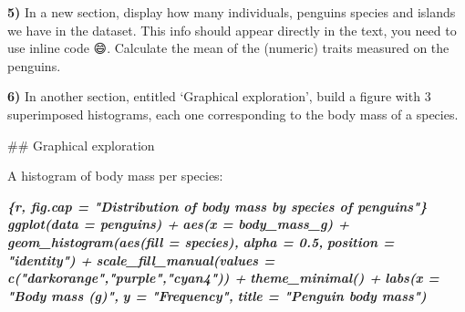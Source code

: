 \documentclass[
  12pt,
]{book}
\newenvironment{Shaded}{\begin{snugshade}}{\end{snugshade}}
\newcommand{\FunctionTok}[1]{\textcolor[rgb]{0.00,0.00,0.00}{#1}}
\newcommand{\InformationTok}[1]{\textcolor[rgb]{0.56,0.35,0.01}{\textbf{\textit{#1}}}}
\newcommand{\NormalTok}[1]{#1}
\begin{document}
\textbf{5)} In a new section, display how many individuals, penguins species and islands we have in the dataset. This info should appear directly in the text, you need to use inline code 😄. Calculate the mean of the (numeric) traits measured on the penguins.

\begin{Shaded}
\end{Shaded}

\textbf{6)} In another section, entitled `Graphical exploration', build a figure with 3 superimposed histograms, each one corresponding to the body mass of a species.

\begin{Shaded}
\begin{Highlighting}[]
\FunctionTok{\#\# Graphical exploration}

\NormalTok{A histogram of body mass per species:}

\InformationTok{\textasciigrave{}\textasciigrave{}\textasciigrave{}\{r, fig.cap = "Distribution of body mass by species of penguins"\}}
\InformationTok{  ggplot(data = penguins) +}
\InformationTok{  aes(x = body\_mass\_g) +}
\InformationTok{  geom\_histogram(aes(fill = species),}
\InformationTok{                 alpha = 0.5,}
\InformationTok{                 position = "identity") +}
\InformationTok{  scale\_fill\_manual(values = c("darkorange","purple","cyan4")) +}
\InformationTok{  theme\_minimal() +}
\InformationTok{  labs(x = "Body mass (g)",}
\InformationTok{       y = "Frequency",}
\InformationTok{       title = "Penguin body mass")}
\InformationTok{\textasciigrave{}\textasciigrave{}\textasciigrave{}}
\end{Highlighting}
\end{Shaded}
\end{document}

